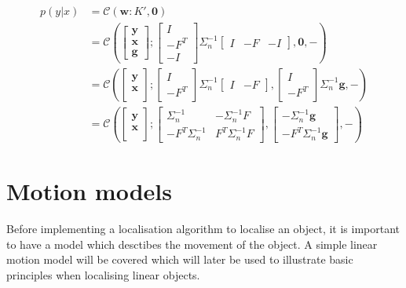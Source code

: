 \documentclass[12pt,oneside,openany,a4paper, %
afrikaans,english,
]{memoir}
\numberwithin{equation}{chapter}
\begin{document}
\begin{equation}
\begin{split}
p(y|x) & = \mathcal{C}(\bm{w}: K', \bm{0})\\
& =\mathcal{C}\left(
\begin{bmatrix}
\bm{y} \\
\bm{x} \\
\bm{g}
\end{bmatrix};
\begin{bmatrix}
I\\
-F^T\\
-I
\end{bmatrix}
\Sigma_n^{-1}
\begin{bmatrix}
I & -F & -I
\end{bmatrix}, \bm{0}, -
\right)\\
& =\mathcal{C}\left(
\begin{bmatrix}
\bm{y} \\
\bm{x} \\
\end{bmatrix};
\begin{bmatrix}
I\\
-F^T
\end{bmatrix}
\Sigma_n^{-1}
\begin{bmatrix}
I & -F
\end{bmatrix},
\begin{bmatrix}
I\\
-F^T
\end{bmatrix}
\Sigma_n^{-1}\bm{g}, -
\right)\\
& =\mathcal{C}\left(
\begin{bmatrix}
\bm{y} \\
\bm{x} \\
\end{bmatrix};
\begin{bmatrix}
\Sigma_n^{-1}  &  -\Sigma_n^{-1}F\\
-F^T\Sigma_n^{-1} & F^T\Sigma_n^{-1}F
\end{bmatrix}
, 
\begin{bmatrix}
-\Sigma_n^{-1}\bm{g}\\
-F^T\Sigma_n^{-1}\bm{g}
\end{bmatrix},
-
\right)
\end{split}
\end{equation}
\chapter{Motion models}
Before implementing a localisation algorithm to localise an object, it is important to have a model which desctibes the movement of the object. A simple linear motion model will be covered which will later be used to illustrate basic principles when localising linear objects. 
\end{document}
